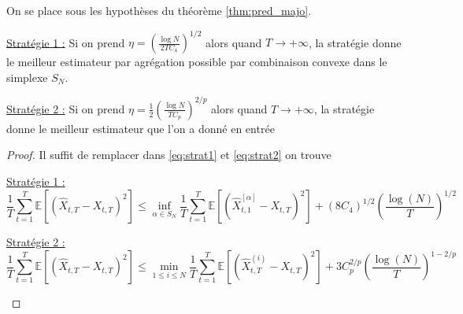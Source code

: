 \documentclass{report}
\begin{document}
\begin{Cor} On se place sous les hypothèses du théorème \ref{thm:pred_majo}. 
\begin{description}
\item{\underline{Stratégie 1 :}} Si on prend $\eta = \left(\frac{\log N}{2TC_4} \right)^{1/2}$ alors quand $T\to +\infty$, la stratégie donne le meilleur estimateur par agrégation possible par combinaison convexe dans le simplexe $S_N$.
\item{\underline{Stratégie 2 :}} Si on prend $\eta = \frac{1}{2}\left(\frac{\log N}{TC_p} \right)^{2/p}$ alors quand $T\to +\infty$, la stratégie donne le meilleur estimateur que l'on a donné en entrée
\end{description}
\end{Cor}
\begin{proof}
Il suffit de remplacer dans \eqref{eq:strat1} et \eqref{eq:strat2} on trouve
\begin{description}
\item{\underline{Stratégie 1 :}}
$$
\frac{1}{T} \sum_{t=1}^T \mathbb{E}[(\hat X_{t,T}-X_{t,T})^2] \leq \inf_{\alpha \in S_N} \frac{1}{T} \sum_{t=1}^T \mathbb{E}[(\hat X_{t,1}^{[\alpha]}-X_{t,T})^2] + (8C_4)^{1/2} \left( \frac{\log(N)}{T} \right)^{1/2}
$$
\item{\underline{Stratégie 2 :}}
$$
\frac{1}{T} \sum_{t=1}^T \mathbb{E}[(\hat X_{t,T}-X_{t,T})^2] \leq \min_{1 \leq i \leq N} \frac{1}{T} \sum_{t=1}^T \mathbb{E}[(\hat X_{t,T}^{(i)}-X_{t,T})^2] + 3C_p^{2/p} \left( \frac{\log(N)}{T} \right)^{1-2/p}
$$
\end{description}
\end{proof}
\end{document}
